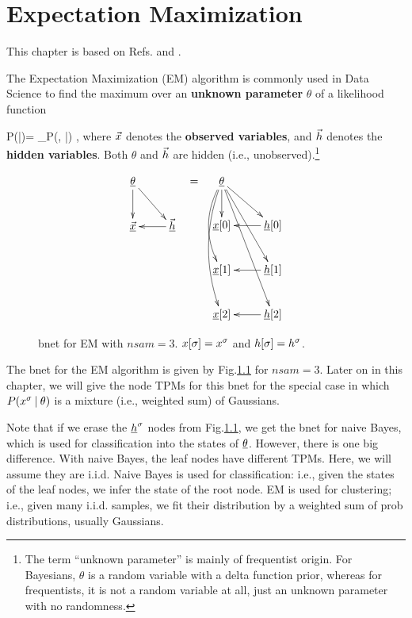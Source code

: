 \chapter{Expectation Maximization}
\label{ch-emax}

This chapter is based on
Refs.\cite{wiki-em}
and \cite{emory-biostat}.

The Expectation Maximization (EM)
algorithm
is commonly used in Data Science
to find the maximum
over an {\bf unknown parameter} $\theta$ of a
 likelihood function

\beq
P(\vecx|\theta)=
\sum_\vech P(\vecx, \vech|\theta)
\;,
\eeq
where ${\vec{x}}$
denotes the {\bf observed variables},
and ${\vec{h}}$ denotes the
{\bf hidden variables}.
Both $\theta$
and ${\vec{h}}$
are hidden (i.e.,
unobserved).\footnote{
The term
\enquote{unknown parameter}
is mainly of frequentist origin.
For Bayesians, $\theta$
is a random variable with
a delta function prior,
whereas for frequentists,
it is not
a random variable at all,
just an unknown parameter
with no randomness.}



\begin{figure}[h!]
\centering
$$\begin{array}{ccc}
\xymatrix{
\ul{\theta}\ar[d]\ar[dr]
\\
\ul{\vecx}&\ul{\vech}\ar[l]
}
&=&
\xymatrix{
\ul{\theta}
\ar[d]
\ar@/_1pc/[dd]
\ar@/_1pc/[ddd]
\ar[rd]\ar[rdd]\ar[rddd]
\\
\rvx[0]
&\rvh[0]\ar[l]
\\
\rvx[1]
&\rvh[1]\ar[l]
\\
\rvx[2]
&\rvh[2]\ar[l]
}
\end{array}
$$
\caption{bnet for EM with $nsam=3$.
$x[\sigma]=x^\sigma$ and $h[\sigma]=h^\sigma$.}
\label{fig-em-bnet}
\end{figure}


The bnet for the EM algorithm
is given by Fig.\ref{fig-em-bnet}
for $nsam=3$.
Later on in this chapter,
we will give the node TPMs
for this bnet for
the special
case in which $P(x^\sigma{\:\mathbf{|}\:} \theta)$
is a mixture (i.e., weighted sum)
of Gaussians.

Note that if we
erase the ${\underline{h}}^\sigma$ nodes
from Fig.\ref{fig-em-bnet},
we get the bnet for naive Bayes,
which is used for classification
into the states of $\underline{\theta}$.
However, there is one big
difference.
With naive Bayes,
the leaf nodes have
different TPMs.
Here, we will assume they are i.i.d.
Naive Bayes is used for classification: i.e.,
given the states
of the leaf nodes,
we infer the state of the root node.
EM is used for clustering; i.e.,
given many i.i.d. samples,
we fit their distribution by a weighted sum
of prob distributions,
usually Gaussians.

